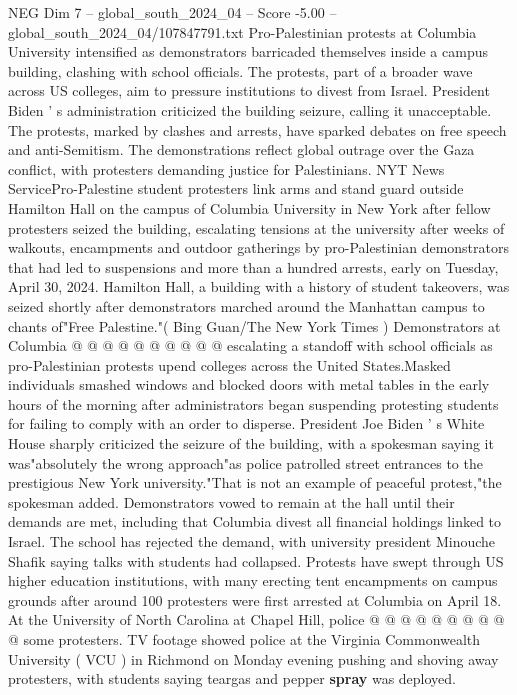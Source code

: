 \begin{textsample}{NEG Dim 7 – global\_south\_2024\_04 – Score -5.00 – global\_south\_2024\_04/107847791.txt}  \label{ex:f7_neg_348}
Pro-Palestinian protests at Columbia University intensified as demonstrators barricaded themselves inside a campus building, clashing with school officials.
The protests, part of a broader wave across US colleges, aim to pressure institutions to divest from Israel.
President Biden ' s administration criticized the building seizure, calling it unacceptable.
The protests, marked by clashes and arrests, have sparked debates on free speech and anti-Semitism.
The demonstrations reflect global outrage over the Gaza conflict, with protesters demanding justice for Palestinians.
NYT News ServicePro-Palestine student protesters link arms and stand guard outside Hamilton Hall on the campus of Columbia University in New York after fellow protesters seized the building, escalating tensions at the university after weeks of walkouts, encampments and outdoor gatherings by pro-Palestinian demonstrators that had led to suspensions and more than a hundred arrests, early on Tuesday, April 30, 2024.
Hamilton Hall, a building with a history of student takeovers, was seized shortly after demonstrators marched around the Manhattan campus to chants of"Free Palestine."( Bing Guan/The New York Times ) Demonstrators at Columbia @ @ @ @ @ @ @ @ @ @ escalating a standoff with school officials as pro-Palestinian protests upend colleges across the United States.Masked individuals smashed windows and blocked doors with metal tables in the early hours of the morning after administrators began suspending protesting students for failing to comply with an order to disperse.
President Joe Biden ' s White House sharply criticized the seizure of the building, with a spokesman saying it was"absolutely the wrong approach"as police patrolled street entrances to the prestigious New York university."That is not an example of peaceful protest,"the spokesman added.
Demonstrators vowed to remain at the hall until their demands are met, including that Columbia divest all financial holdings linked to Israel.
The school has rejected the demand, with university president Minouche Shafik saying talks with students had collapsed.
Protests have swept through US higher education institutions, with many erecting tent encampments on campus grounds after around 100 protesters were first arrested at Columbia on April 18.
At the University of North Carolina at Chapel Hill, police @ @ @ @ @ @ @ @ @ @ some protesters.
TV footage showed police at the Virginia Commonwealth University ( VCU ) in Richmond on Monday evening pushing and shoving away protesters, with students saying teargas and pepper \textbf{spray} was deployed.

\end{textsample}

